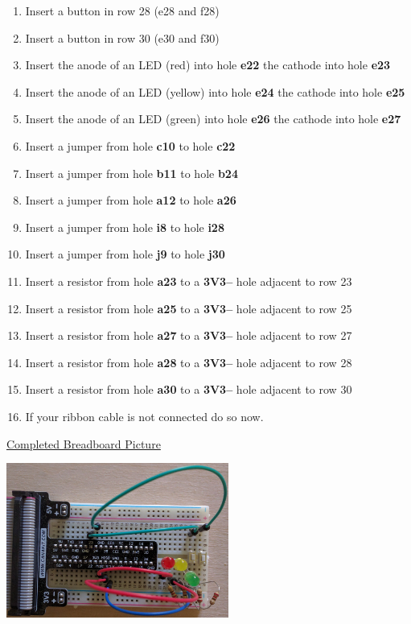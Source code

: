 \begin{enumerate}
	\item Insert a button in row 28 (e28 and f28)
	\item Insert a button in row 30 (e30 and f30)
	
	\item Insert the anode of an LED (red) into hole \textbf{e22} the cathode into hole \textbf{e23}
	\item Insert the anode of an LED (yellow) into hole \textbf{e24} the cathode into hole \textbf{e25}
	\item Insert the anode of an LED (green) into hole \textbf{e26} the cathode into hole \textbf{e27}
	
	\item Insert a jumper from hole \textbf{c10} to hole \textbf{c22}
	\item Insert a jumper from hole \textbf{b11} to hole \textbf{b24}
	\item Insert a jumper from hole \textbf{a12} to hole \textbf{a26}
	
	\item Insert a jumper from hole \textbf{i8} to hole \textbf{i28}
	\item Insert a jumper from hole \textbf{j9} to hole \textbf{j30}
	
	\item Insert a resistor from hole \textbf{a23} to a \textbf{3V3--} hole adjacent to row 23
	\item Insert a resistor from hole \textbf{a25} to a \textbf{3V3--} hole adjacent to row 25
	\item Insert a resistor from hole \textbf{a27} to a \textbf{3V3--} hole adjacent to row 27	
	\item Insert a resistor from hole \textbf{a28} to a \textbf{3V3--} hole adjacent to row 28
	\item Insert a resistor from hole \textbf{a30} to a \textbf{3V3--} hole adjacent to row 30
	
	\item If your ribbon cable is not connected do so now.
\end{enumerate}

\underline{Completed Breadboard Picture}

\beforefig
\centerline{\includegraphics[height=2in]{pi_images/lab04images/PiLab04-StopLightPhoto.jpg}}
\afterfig

